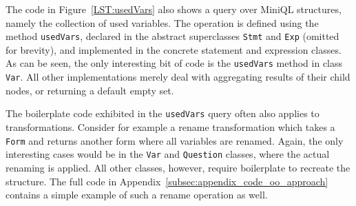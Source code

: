 
The code in Figure~\ref{LST:usedVars} also shows a query over MiniQL structures, namely the collection of used variables.
The operation is defined using the method \lstinline{usedVars}, declared in the abstract superclasses  \lstinline{Stmt} and \lstinline{Exp} (omitted for brevity), and implemented in the concrete statement and expression classes.
As can be seen, the only interesting bit of code is the \lstinline{usedVars} method in class \lstinline{Var}.
All other implementations merely deal with aggregating results of their child nodes, or returning a default empty set.

The boilerplate code exhibited in the \lstinline{usedVars} query often
also applies to transformations.  Consider for example a rename
transformation which takes a \lstinline{Form} and returns another form
where all variables are renamed.  Again, the only interesting cases would be
in the \lstinline{Var} and {\small\texttt{Question}} classes, where the actual renaming is
applied. All other classes, however, require boilerplate to recreate
the structure. The full code in
Appendix~\ref{subsec:appendix_code_oo_approach} contains a simple
example of such a rename operation as well.


\begin{figure*}[t]
  \nocaptionrule
  \begin{minipage}[t]{0.48\textwidth}
  \end{minipage}
  \vline
  \hspace*{2pt}
  \begin{minipage}[t]{0.48\textwidth}
  \end{minipage}

    \caption{Implementing the ``used variables'' operation using traditional ASTs (left) and Object Algebras (right).}\label{LST:usedVars}
\end{figure*}

